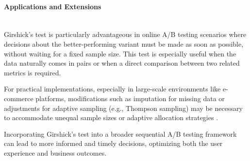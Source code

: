 \documentclass[magisterska, english]{pwr_wmat_praca_dyplomowa}
\theoremstyle{plain}
\numberwithin{theorem}{chapter}
\theoremstyle{definition}
\numberwithin{theorem}{chapter}
\newcommand{\myparagraph}[1]{\paragraph{#1}\mbox{}\\}
\begin{document}
%
%
%
%
\myparagraph{Applications and Extensions}

Girshick's test is particularly advantageous in online A/B testing scenarios where decisions about the better-performing variant must be made as soon as possible, without waiting for a fixed sample size. This test is especially useful when the data naturally comes in pairs or when a direct comparison between two related metrics is required.

For practical implementations, especially in large-scale environments like e-commerce platforms, modifications such as imputation for missing data or adjustments for adaptive sampling (e.g., Thompson sampling) may be necessary to accommodate unequal sample sizes or adaptive allocation strategies \cite{ju2019sequential}.

Incorporating Girshick's test into a broader sequential A/B testing framework can lead to more informed and timely decisions, optimizing both the user experience and business outcomes.
\end{document}
